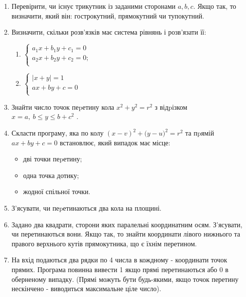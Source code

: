 \documentclass[]{article}
\makeatletter
\newcommand{\xslalph}[1]{\expandafter\@xslalph\csname c@#1\endcsname}
\newcommand{\@xslalph}[1]{%
    \ifcase#1\or а\or б\or в\or г\or д\or e\or є\or ж\or з\or i%
    \or й\or к\or л\or м\or н\or о\or п\or р\or с\or т%
    \or у\or ф\or х\or ц\or ч\or ш\or ю\or я\or аа\or бб\or вв %
    \else\@ctrerr\fi%
}
\makeatother
\begin{document}
\begin{enumerate}
\item
  Перевірити, чи існує трикутник із заданими сторонами $a,b,c$.
  Якщо так, то визначити, який він: гострокутний, прямокутний чи
  тупокутний.

\item
  Визначити, скільки розв'язків має система рівнянь і розв'язати її:
  \begin{multicols}{2}
\begin{enumerate}[label=\xslalph*)]
\item \(\left\{ \begin{matrix}
a_{1}x + b_{1}y + c_{1} = 0 \\
a_{2}x + b_{2}y + c_{2} = 0; \\
\end{matrix} \right.\ \) 

\item \(\left\{ \begin{matrix}
\left| x + y \right| = 1 \\
ax + by + c = 0 \\
\end{matrix} \right.\ \)
\end{enumerate}
 \end{multicols}

\item
  Знайти число точок пеpетину кола \(x^{2} + y^{2} = r^{2}\) з відpізком
  \(x = a,\ b \leq y \leq b + c^{2}\) .
\item
  Скласти програму, яка по колу
  \({(x - v)}^{2} + ({y - u)}^{2} = r^{2}\) та пpямій
  \(ax + by + c = 0\) встановлює, який випадок має місце:
\begin{itemize}
\item дві точки пеpетину;
\item одна точка дотику;
\item жодної спільної точки.
\end{itemize}

\item
  З'ясувати, чи пеpетинаються два кола на площині.
\item
  Задано два квадрати, сторони яких паралельні координатним осям.
  З'ясувати, чи перетинаються вони. Якщо так, то знайти координати
  лівого нижнього та правого верхнього кутів прямокутника, що є їхнім
  перетином.
\item

На вхід подаються два рядки по 4 числа в кождному - координати точок прямих.
Програма повинна вивести 1 якщо прямі перетинаються або 0 в оберненому випадку.
(Прямі можуть бути будь-якими, якщо точок перетину нескінчено - виводиться максимальне ціле число).


\end{enumerate}
\end{document}
